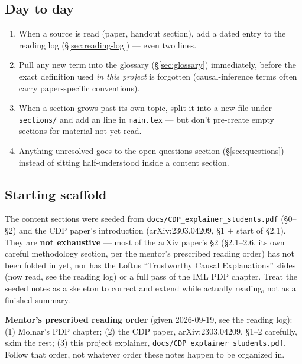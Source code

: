\subsection*{Day to day}

\begin{enumerate}
  \item When a source is read (paper, handout section), add a dated entry to
    the reading log (\S\ref{sec:reading-log}) --- even two lines.
  \item Pull any new term into the glossary (\S\ref{sec:glossary})
    immediately, before the exact definition used \emph{in this project} is
    forgotten (causal-inference terms often carry paper-specific
    conventions).
  \item When a section grows past its own topic, split it into a new file
    under \texttt{sections/} and add an \verb|| line in
    \texttt{main.tex} --- but don't pre-create empty sections for material
    not yet read.
  \item Anything unresolved goes to the open-questions section
    (\S\ref{sec:questions}) instead of sitting half-understood inside a
    content section.
\end{enumerate}

\subsection*{Starting scaffold}

The content sections were seeded from \texttt{docs/CDP\_explainer\_students.pdf}
(\S0--\S2) and the CDP paper's introduction (arXiv:2303.04209, \S1 $+$ start
of \S2.1). They are \textbf{not exhaustive} --- most of the arXiv paper's
\S2 (\S2.1--2.6, its own careful methodology section, per the mentor's
prescribed reading order) has not been folded in yet, nor has the Loftus
``Trustworthy Causal Explanations'' slides (now read, see the reading log)
or a full pass of the IML PDP chapter. Treat the seeded notes as a skeleton
to correct and extend while actually reading, not as a finished summary.

\textbf{Mentor's prescribed reading order} (given 2026-09-19, see the
reading log): (1) Molnar's PDP chapter; (2) the CDP paper,
arXiv:2303.04209, \S1--2 carefully, skim the rest; (3) this project
explainer, \texttt{docs/CDP\_explainer\_students.pdf}. Follow that order,
not whatever order these notes happen to be organized in.
